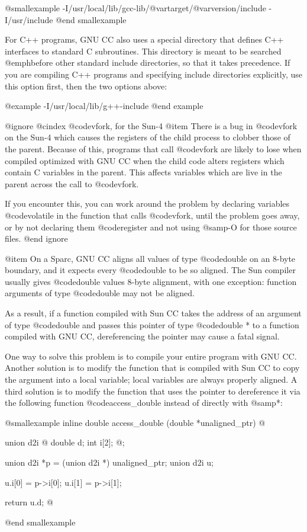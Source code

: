 @smallexample
-I/usr/local/lib/gcc-lib/@var{target}/@var{version}/include -I/usr/include
@end smallexample

For C++ programs, GNU CC also uses a special directory that defines C++
interfaces to standard C subroutines.  This directory is meant to be
searched @emph{before} other standard include directories, so that it
takes precedence.  If you are compiling C++ programs and specifying
include directories explicitly, use this option first, then the two
options above:

@example
-I/usr/local/lib/g++-include
@end example

@ignore
@cindex @code{vfork}, for the Sun-4
@item
There is a bug in @code{vfork} on the Sun-4 which causes the registers
of the child process to clobber those of the parent.  Because of this,
programs that call @code{vfork} are likely to lose when compiled
optimized with GNU CC when the child code alters registers which contain
C variables in the parent.  This affects variables which are live in the
parent across the call to @code{vfork}.

If you encounter this, you can work around the problem by declaring
variables @code{volatile} in the function that calls @code{vfork}, until
the problem goes away, or by not declaring them @code{register} and not
using @samp{-O} for those source files.
@end ignore

@item
On a Sparc, GNU CC aligns all values of type @code{double} on an 8-byte
boundary, and it expects every @code{double} to be so aligned.  The Sun
compiler usually gives @code{double} values 8-byte alignment, with one
exception: function arguments of type @code{double} may not be aligned.

As a result, if a function compiled with Sun CC takes the address of an
argument of type @code{double} and passes this pointer of type
@code{double *} to a function compiled with GNU CC, dereferencing the
pointer may cause a fatal signal.

One way to solve this problem is to compile your entire program with GNU
CC.  Another solution is to modify the function that is compiled with
Sun CC to copy the argument into a local variable; local variables
are always properly aligned.  A third solution is to modify the function
that uses the pointer to dereference it via the following function
@code{access_double} instead of directly with @samp{*}:

@smallexample
inline double
access_double (double *unaligned_ptr)
@{
  union d2i @{ double d; int i[2]; @};

  union d2i *p = (union d2i *) unaligned_ptr;
  union d2i u;

  u.i[0] = p->i[0];
  u.i[1] = p->i[1];

  return u.d;
@}
@end smallexample

